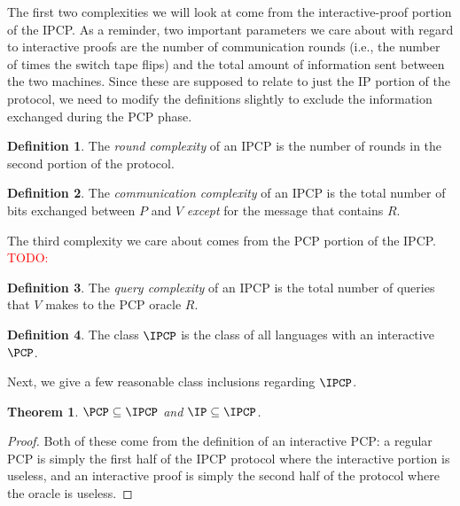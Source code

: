 \documentclass[english,12pt]{reedthesis}
\theoremstyle{plain}
\newtheorem{thm}{Theorem}[section]
\theoremstyle{definition}
\newtheorem{defn}[defn]{Definition}
\theoremstyle{remark}
\newcommand{\TODO}[1]{\textcolor{red}{TODO: #1}}
\begin{document}
The first two complexities we will look at come from the interactive-proof
portion of the IPCP\@. As a reminder, two important parameters we care about
with regard to interactive proofs are the number of communication rounds (i.e.,
the number of times the switch tape flips) and the total amount of information
sent between the two machines. Since these are supposed to relate to just the IP
portion of the protocol, we need to modify the definitions slightly to exclude
the information exchanged during the PCP phase.

\begin{defn}\label{def:ipcp-round-complexity}
  The \emph{round complexity} of an IPCP is the number of rounds in the second
  portion of the protocol.
\end{defn}

\begin{defn}\label{def:ipcp-comm-complexity}
  The \emph{communication complexity} of an IPCP is the total number of bits
  exchanged between $P$ and $V$ \emph{except} for the message that contains $R$.
\end{defn}

The third complexity we care about comes from the PCP portion of the IPCP\@.
\TODO{}

\begin{defn}
  The \emph{query complexity} of an IPCP is the total number of queries that $V$
  makes to the PCP oracle $R$.
\end{defn}

\begin{defn}\label{def:ipcp-class}
  The class $\IPCP$ is the class of all languages with an interactive $\PCP$.
\end{defn}

Next, we give a few reasonable class inclusions regarding $\IPCP$.

\begin{thm}
  $\PCP \subseteq \IPCP$ and $\IP \subseteq \IPCP$.
\end{thm}

\begin{proof}
  Both of these come from the definition of an interactive PCP: a regular PCP is
  simply the first half of the IPCP protocol where the interactive portion is
  useless, and an interactive proof is simply the second half of the protocol
  where the oracle is useless.
\end{proof}
\end{document}
